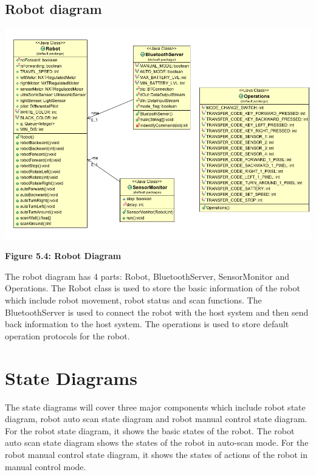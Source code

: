 \documentclass[11pt, a4paper]{report}
\begin{document}
\subsection{Robot diagram}
 \begin{center}
 \includegraphics[width=18.20cm]{Robot.png}
\end{center}
\begin{center}
\textbf {Figure 5.4: Robot Diagram} \\[0.3cm]
\end{center}
The robot diagram has 4 parts: Robot, BluetoothServer, SensorMonitor and Operations. The Robot class is used to store the basic information of the robot which include robot movement, robot status and scan functions. The BluetoothServer is used to connect the robot with the host system and then send back information to the host system. The operations is used to store default operation protocols for the robot. 
\pagebreak

\section{State Diagrams}
The state diagrams will cover three major components which include robot state diagram, robot auto scan state diagram and  robot manual control state diagram. For the robot state diagram, it shows the basic states of the robot. The robot auto scan state diagram shows the states of the robot in auto-scan mode. For the robot manual control state diagram, it shows the states of actions of the robot in manual control mode.
\end{document}
